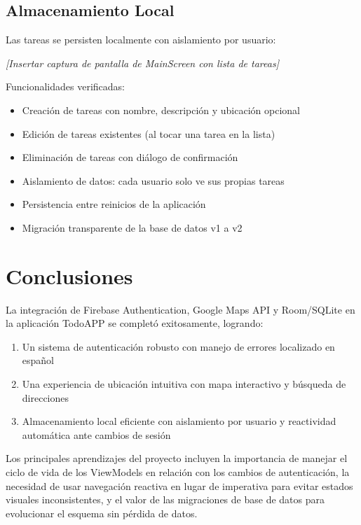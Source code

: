 \documentclass[12pt,a4paper]{article}
\begin{document}
\subsection{Almacenamiento Local}

Las tareas se persisten localmente con aislamiento por usuario:

\begin{center}
    \textit{[Insertar captura de pantalla de MainScreen con lista de tareas]}
\end{center}

Funcionalidades verificadas:
\begin{itemize}
    \item Creación de tareas con nombre, descripción y ubicación opcional
    \item Edición de tareas existentes (al tocar una tarea en la lista)
    \item Eliminación de tareas con diálogo de confirmación
    \item Aislamiento de datos: cada usuario solo ve sus propias tareas
    \item Persistencia entre reinicios de la aplicación
    \item Migración transparente de la base de datos v1 a v2
\end{itemize}

\section{Conclusiones}

La integración de Firebase Authentication, Google Maps API y Room/SQLite en la aplicación TodoAPP se completó exitosamente, logrando:

\begin{enumerate}
    \item Un sistema de autenticación robusto con manejo de errores localizado en español
    \item Una experiencia de ubicación intuitiva con mapa interactivo y búsqueda de direcciones
    \item Almacenamiento local eficiente con aislamiento por usuario y reactividad automática ante cambios de sesión
\end{enumerate}

Los principales aprendizajes del proyecto incluyen la importancia de manejar el ciclo de vida de los ViewModels en relación con los cambios de autenticación, la necesidad de usar navegación reactiva en lugar de imperativa para evitar estados visuales inconsistentes, y el valor de las migraciones de base de datos para evolucionar el esquema sin pérdida de datos.
\end{document}
